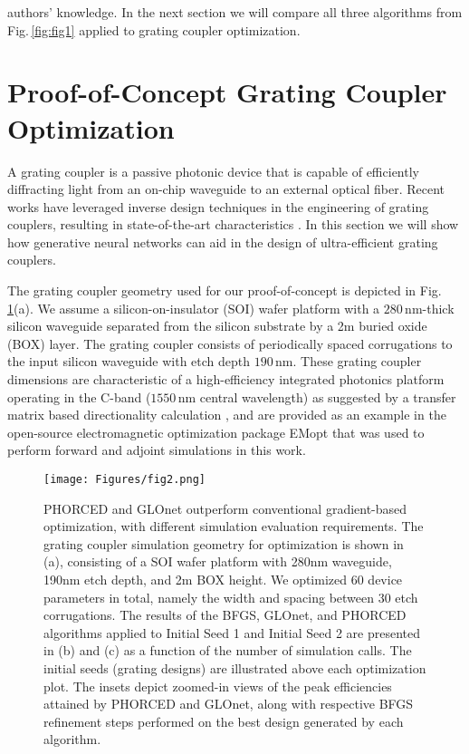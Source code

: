 \documentclass{article}
\begin{document}
authors' knowledge. In the next section we will compare all three algorithms from Fig.\,\ref{fig:fig1} applied to grating coupler optimization.



\section{Proof-of-Concept Grating Coupler Optimization}
\label{sec:GCopt}

A grating coupler is a passive photonic device that is capable of efficiently diffracting light from an on-chip waveguide to an external optical fiber. Recent works have leveraged inverse design techniques in the engineering of grating couplers, resulting in state-of-the-art characteristics \cite{michaels_inverse_2018, su_fully-automated_2017, hooten_adjoint_2020, sun_adjoint-method-inspired_2020, dezfouli_design_2021}. In this section we will show how generative neural networks can aid in the design of ultra-efficient grating couplers.

The grating coupler geometry used for our proof-of-concept is depicted in Fig.\,\ref{fig:fig2}(a). We assume a silicon-on-insulator (SOI) wafer platform with a $280\,\mathrm{nm}$-thick silicon waveguide separated from the silicon substrate by a 2\textmu m buried oxide (BOX) layer. The grating coupler consists of periodically spaced corrugations to the input silicon waveguide with etch depth $190\,\mathrm{nm}$. These grating coupler dimensions are characteristic of a high-efficiency integrated photonics platform operating in the C-band ($1550\,\mathrm{nm}$ central wavelength) as suggested by a transfer matrix based directionality calculation \cite{michaels_hierarchical_2020,michaels_gcslab_2019}, and are provided as an example in the open-source electromagnetic optimization package EMopt \cite{michaels_emopt_2019} that was used to perform forward and adjoint simulations in this work. 
\begin{figure}[t!]
    \centering
    \texttt{[image: Figures/fig2.png]}
    \caption{PHORCED and GLOnet outperform conventional gradient-based optimization, with different simulation evaluation requirements. The grating coupler simulation geometry for optimization is shown in (a), consisting of a SOI wafer platform with 280nm waveguide, 190nm etch depth, and 2\textmu m BOX height. We optimized 60 device parameters in total, namely the width and spacing between 30 etch corrugations. The results of the BFGS, GLOnet, and PHORCED algorithms applied to Initial Seed 1 and Initial Seed 2 are presented in (b) and (c) as a function of the number of simulation calls. The initial seeds (grating designs) are illustrated above each optimization plot. The insets depict zoomed-in views of the peak efficiencies attained by PHORCED and GLOnet, along with respective BFGS refinement steps performed on the best design generated by each algorithm.}
    \label{fig:fig2}
\end{figure}
\end{document}
